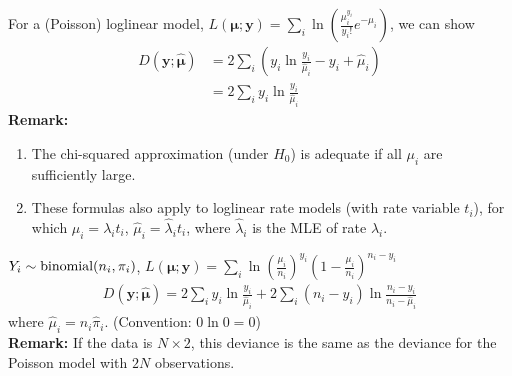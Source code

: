 \documentclass[11pt]{elegantbook}
\begin{document}
\begin{example}
    For a (Poisson) loglinear model, $L(\boldsymbol{\mu};\boldsymbol{y})=\sum_{i} \ln \left(\frac{\mu_i^{y_i}}{y_i !} e^{-\mu_i}\right)$, we can show
    \begin{equation}
        \begin{aligned}
            D(\boldsymbol{y} ; \hat{\boldsymbol{\mu}})&=2\sum_i \left(y_i\ln\frac{y_i}{\hat{\mu}_i}-y_i+\hat{\mu}_i\right)\\
            &=2\sum_i y_i\ln\frac{y_i}{\hat{\mu}_i}
        \end{aligned}
        \nonumber
    \end{equation}
    \textbf{Remark:}
    \begin{enumerate}[$\bullet$]
        \item The chi-squared approximation (under $H_0$) is adequate if all $\mu_i$ are sufficiently large.
        \item These formulas also apply to loglinear rate models (with rate variable $t_i$), for which $\mu_i=\lambda_i t_i$, $\hat{\mu}_i=\hat{\lambda}_i t_i$, where $\hat{\lambda}_i$ is the MLE of rate $\lambda_i$.
    \end{enumerate}
\end{example}
\begin{example}
    $Y_i\sim \textnormal{binomial}(n_i,\pi_i)$, $L(\boldsymbol{\mu};\boldsymbol{y})=\sum_{i} \ln \left(\frac{\mu_i}{n_i}\right)^{y_i}\left(1-\frac{\mu_i}{n_i}\right)^{n_i-y_i}$
    \begin{equation}
        \begin{aligned}
            D(\boldsymbol{y} ; \hat{\boldsymbol{\mu}})=2\sum_i y_i\ln\frac{y_i}{\hat{\mu}_i}+2\sum_i(n_i-y_i)\ln \frac{n_i-y_i}{n_i-\hat{\mu}_i}
        \end{aligned}
        \nonumber
    \end{equation}
    where $\hat{\mu}_i=n_i\hat{\pi}_i$. (Convention: $0\ln 0=0$)\\
    \textbf{Remark:} If the data is $N\times 2$, this deviance is the same as the deviance for the Poisson model with $2N$ observations.
\end{example}
\end{document}
